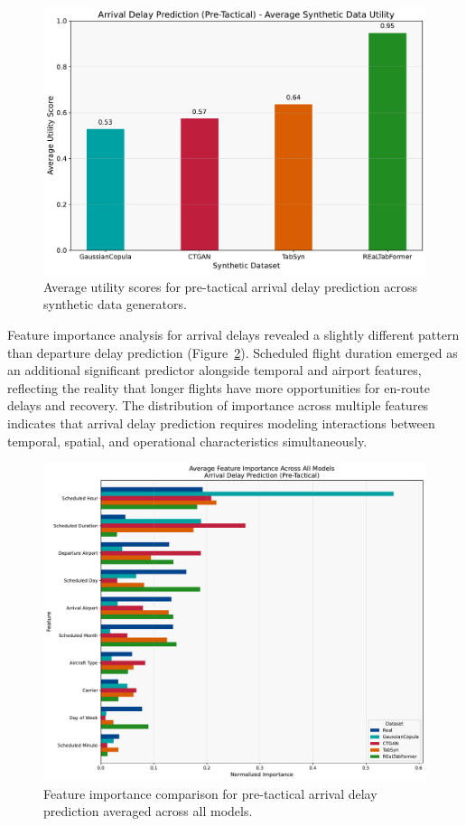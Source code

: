 \documentclass[conference]{IEEEtran}
\begin{document}
\begin{figure}[htbp]
    \centering
    \includegraphics[width=0.8\linewidth]{plots/arrival_delay_min_pre-tactical/arrival_delay_min_pre-tactical_avg_utility.pdf}
    \caption{Average utility scores for pre-tactical arrival delay prediction across synthetic data generators.}
    \label{fig:arrival_pre_utility}
\end{figure}

Feature importance analysis for arrival delays revealed a slightly different pattern than departure delay prediction (Figure~\ref{fig:arrival_features}). Scheduled flight duration emerged as an additional significant predictor alongside temporal and airport features, reflecting the reality that longer flights have more opportunities for en-route delays and recovery. The distribution of importance across multiple features indicates that arrival delay prediction requires modeling interactions between temporal, spatial, and operational characteristics simultaneously.

\begin{figure}[htbp]
    \centering
    \includegraphics[width=\linewidth]{plots/arrival_delay_min_pre-tactical/feature_importances/arrival_delay_min_pre-tactical_all_models_feature_comparison.pdf}
    \caption{Feature importance comparison for pre-tactical arrival delay prediction averaged across all models.}
    \label{fig:arrival_features}
\end{figure}
\end{document}
